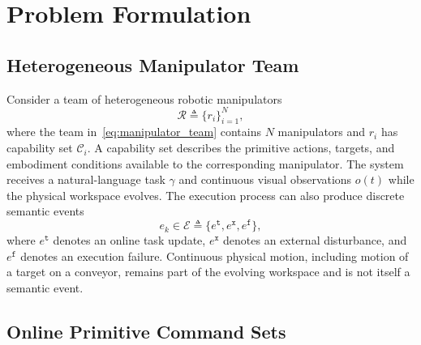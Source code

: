 \section{Problem Formulation}
\label{sec:formulation}

\providecommand{\structurechange}[1]{#1}
\newtheorem{problem}{Problem}

\subsection{Heterogeneous Manipulator Team}
\label{sec:system_description}

Consider a team of heterogeneous robotic manipulators
\begin{equation}
 \mathcal{R}\triangleq\{r_i\}_{i=1}^{N},
 \label{eq:manipulator_team}
\end{equation}
where the team in~\eqref{eq:manipulator_team} contains $N$ manipulators and
$r_i$ has capability set
$\mathcal{C}_i$. A capability set describes the primitive actions, targets,
and embodiment conditions available to the corresponding manipulator. The
system receives a natural-language task $\gamma$ and continuous visual
observations $o(t)$ while the physical workspace evolves.
The execution process can also produce discrete semantic events
\begin{equation}
 e_k\in\mathcal{E}\triangleq
 \{e^{\texttt{t}},e^{\texttt{x}},e^{\texttt{f}}\},
 \label{eq:semantic_events}
\end{equation}
where $e^{\texttt{t}}$ denotes an online task update, $e^{\texttt{x}}$ denotes
an external disturbance, and $e^{\texttt{f}}$ denotes an execution failure.
Continuous physical motion, including motion of a target on a conveyor, remains
part of the evolving workspace and is not itself a semantic event.

\subsection{Online Primitive Command Sets}
\label{sec:online_commands}

